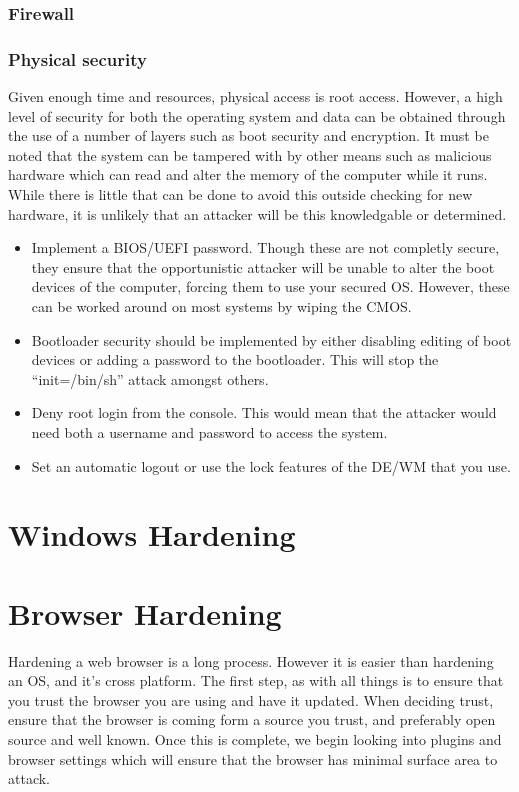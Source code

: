 \documentclass[a4paper,11pt]{book}
\begin{document}
				\subsubsection{Firewall} %
				\subsubsection{Physical security}
					Given enough time and resources, physical access is root access. 
					However, a high level of security for both the operating system and data can be obtained through the use of a number of layers such as boot security and encryption. 
					It must be noted that the system can be tampered with by other means such as malicious hardware which can read and alter the memory of the computer while it runs. While there is little that can be done to avoid this outside checking for new hardware, it is unlikely that an attacker will be this knowledgable or determined. 
					\begin{itemize}
						\item Implement a BIOS/UEFI password. 
							Though these are not completly secure, they ensure that the opportunistic attacker will be unable to alter the boot devices of the computer, forcing them to use your secured OS. 
							However, these can be worked around on most systems by wiping the CMOS. 
						\item Bootloader security should be implemented by either disabling editing of boot devices or adding a password to the bootloader. 
							This will stop the ``init=/bin/sh'' attack amongst others. 
						\item Deny root login from the console. 
							This would mean that the attacker would need both a username and password to access the system. 
						\item Set an automatic logout or use the lock features of the DE/WM that you use. 
					\end{itemize}
	\section{Windows Hardening}
	\section{Browser Hardening}
		Hardening a web browser is a long process. However it is easier than hardening an OS, and it's cross platform. 
		The first step, as with all things is to ensure that you trust the browser you are using and have it updated. 
		When deciding trust, ensure that the browser is coming form a source you trust, and preferably open source and well known. 
		Once this is complete, we begin looking into plugins and browser settings which will ensure that the browser has minimal surface area to attack. 
\end{document}
